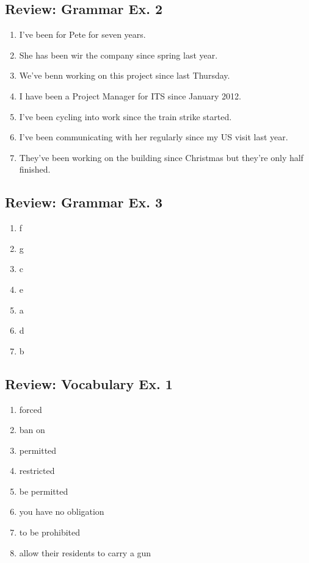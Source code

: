 \documentclass[12pt, a4paper, oneside]{article}
\begin{document}
  \subsection{Review: Grammar Ex. 2}
  \begin{enumerate}[1.]
    \item I've been for Pete for seven years.
    \item She has been wir the company since spring last year.
    \item We've benn working on this project since last Thursday.
    \item I have been a Project Manager for ITS since January 2012.
    \item I've been cycling into work since the train strike started.
    \item I've been communicating with her regularly since my US visit last year.
    \item They've been working on the building since Christmas but they're only half finished.
  \end{enumerate}

  \subsection{Review: Grammar Ex. 3}
  \begin{enumerate}[1.]
    \item f
    \item g
    \item c
    \item e
    \item a
    \item d
    \item b
  \end{enumerate}

  \subsection{Review: Vocabulary Ex. 1}
  \begin{enumerate}[1.]
    \item forced
    \item ban on
    \item permitted
    \item restricted
    \item be permitted
    \item you have no obligation
    \item to be prohibited
    \item allow their residents to carry a gun
  \end{enumerate}
\end{document}
